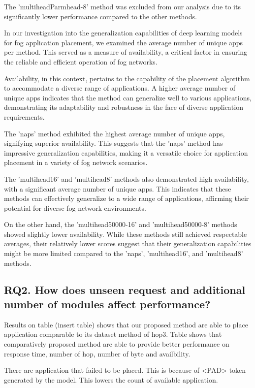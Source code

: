 \documentclass[conference]{IEEEtran}
\begin{document}
The 'multiheadParmhead-8' method was excluded from our analysis due to its significantly lower performance compared to the other methods.

In our investigation into the generalization capabilities of deep learning models for fog application placement, we examined the average number of unique apps per method. This served as a measure of availability, a critical factor in ensuring the reliable and efficient operation of fog networks.

Availability, in this context, pertains to the capability of the placement algorithm to accommodate a diverse range of applications. A higher average number of unique apps indicates that the method can generalize well to various applications, demonstrating its adaptability and robustness in the face of diverse application requirements.

The 'naps' method exhibited the highest average number of unique apps, signifying superior availability. This suggests that the 'naps' method has impressive generalization capabilities, making it a versatile choice for application placement in a variety of fog network scenarios.

The 'multihead16' and 'multihead8' methods also demonstrated high availability, with a significant average number of unique apps. This indicates that these methods can effectively generalize to a wide range of applications, affirming their potential for diverse fog network environments.

On the other hand, the 'multihead50000-16' and 'multihead50000-8' methods showed slightly lower availability. While these methods still achieved respectable averages, their relatively lower scores suggest that their generalization capabilities might be more limited compared to the 'naps', 'multihead16', and 'multihead8' methods.

\subsection*{RQ2. How does unseen request and additional number of modules affect performance?}

Results on table (insert table) shows that our proposed method are able to place application comparable to its dataset method of hop3. Table shows that comparatively proposed method are able to provide better performance on response time, number of hop, number of byte and availbility. 

There are application that failed to be placed. This is because of <PAD> token generated by the model. This lowers the count of available application. 
\end{document}
